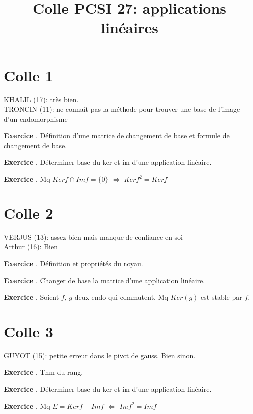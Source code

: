 \documentclass[10pt,a4paper]{article}
\title{Colle PCSI 27: applications linéaires}
\newcounter{question}
\newcounter{exo}
\newenvironment{exo}{\vspace{0.5cm}\setcounter{question}{0}\addtocounter{exo}{1} \noindent \textbf{Exercice \theexo}. \normalsize }{\par}
\begin{document}
	\maketitle
	
	\section*{Colle 1}

	\setcounter{exo}{0}
	KHALIL (17): très bien.\\
	TRONCIN (11): ne connaît pas la méthode pour trouver une base de l'image d'un endomorphisme\\
	
	\begin{exo}
		Définition d'une matrice de changement de base et formule de changement de base.
	\end{exo}

	\begin{exo}
		Déterminer base du ker et im d'une application linéaire.
	\end{exo}	

	\begin{exo}
		Mq $Ker f \cap Im f = \lbrace 0 \rbrace$ $\Longleftrightarrow$ $Ker f^2 = Ker f$
	\end{exo}
	
	\section*{Colle 2}

	\setcounter{exo}{0}
	VERJUS (13): assez bien mais manque de confiance en soi\\
	Arthur (16): Bien\\
	
	\begin{exo}
		Définition et propriétés du noyau.
	\end{exo}
		
	\begin{exo}
		Changer de base la matrice d'une application linéaire.	
	\end{exo}	
	
	\begin{exo}
		Soient $f$, $g$ deux endo qui commutent. Mq $Ker(g)$ est stable par $f$.
	\end{exo}
	
	\section*{Colle 3}
	\setcounter{exo}{0}
	GUYOT (15): petite erreur dans le pivot de gauss. Bien sinon.\\
	
	\begin{exo}
		Thm du rang.
	\end{exo}

	\begin{exo}
		Déterminer base du ker et im d'une application linéaire.
	\end{exo}	

	\begin{exo}
		Mq $E = Ker f + Im f$ $\Longleftrightarrow$ $Im f^2 = Im f$
	\end{exo}
\end{document}
